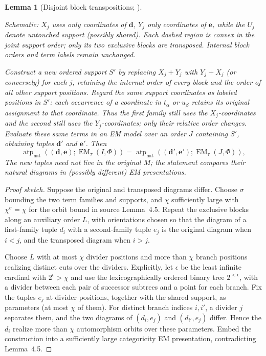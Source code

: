 \documentclass[11pt]{article}
\newcommand{\natatp}{\operatorname{atp}_{\mathrm{nat}}}
\newcommand{\EM}{\operatorname{EM}_{\tau}}
\newcommand{\bd}{\mathbf{d}}
\newcommand{\be}{\mathbf{e}}
\theoremstyle{plain}
\newtheorem{lemma}[definition]{Lemma}
\begin{document}
\begin{lemma}[Disjoint block transpositions;
{\cite[Lemma 4.6]{oai-ecc}}]
\begin{center}
{\small Schematic: $X_j$ uses only coordinates of $\bd$,
$Y_j$ only coordinates of $\be$, while the $U_j$ denote
untouched support (possibly shared). Each dashed region is
convex in the \emph{joint support order}; only its two exclusive
blocks are transposed. Internal block orders and term labels
remain unchanged.}
\end{center}

Construct a new ordered support $S'$ by replacing
$X_j+Y_j$ with $Y_j+X_j$ (or conversely) for each $j$,
retaining the internal order of every block and the
order of all other support positions. Regard the same
support coordinates as labeled positions in $S'$:
each occurrence of a coordinate in $t_\alpha$ or
$u_\beta$ retains its original assignment to that
coordinate. Thus the first family still uses the
$X_j$-coordinates and the second still uses the
$Y_j$-coordinates; \emph{only their relative order
changes}. Evaluate these same terms in an EM model
over an order $J$ containing $S'$, obtaining tuples
$\bd'$ and $\be'$. Then
\[
\natatp((\bd,\be);\EM(I,\Phi))
=
\natatp((\bd',\be');\EM(J,\Phi)),
\]
The new tuples need not live in the original $M$;
the statement compares their natural diagrams in
(possibly different) EM presentations.
\end{lemma}
\begin{proof}[Proof sketch]
Suppose the original and transposed diagrams differ.
Choose $\sigma$ bounding the two term families and supports,
and $\chi$ sufficiently large with $\chi^\sigma=\chi$ for
the orbit bound in source Lemma~4.5. Repeat the exclusive
blocks along an auxiliary order $L$, with orientations
chosen so that the diagram of a first-family tuple $d_i$
with a second-family tuple $e_j$ is the original diagram
when $i<j$, and the transposed diagram when $i>j$.

Choose $L$ with at most $\chi$ divider positions and more
than $\chi$ branch positions realizing distinct cuts over
the dividers. Explicitly, let $\epsilon$ be the least infinite
cardinal with $2^\epsilon>\chi$ and use the lexicographically
ordered binary tree $2^{<\epsilon}$, with a divider between
each pair of successor subtrees and a point for each branch.
Fix the tuples $e_j$ at divider positions, together with
the shared support, as parameters (at most $\chi$ of them).
For distinct branch indices $i,i'$, a divider $j$ separates
them, and the two diagrams of $(d_i,e_j)$ and
$(d_{i'},e_j)$ differ. Hence the $d_i$ realize more than
$\chi$ automorphism orbits over these parameters.
Embed the construction into a sufficiently large
categoricity EM presentation, contradicting Lemma~4.5.
\end{proof}
\end{document}
